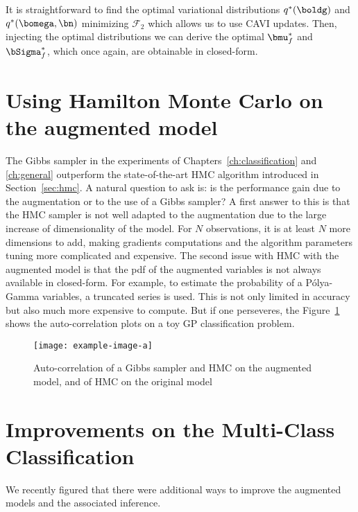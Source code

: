 It is straightforward to find the optimal variational distributions $q^*(\boldg)$ and $q^*(\bomega,\bn)$ minimizing $\mathcal{F}_2$ which allows us to use \ac{CAVI} updates.
Then, injecting the optimal distributions we can derive the optimal $\bmu_f^*$ and $\bSigma_f^*$, which once again, are obtainable in closed-form.


\section{Using Hamilton Monte Carlo on the augmented model}

The Gibbs sampler in the experiments of Chapters~\ref{ch:classification} and \ref{ch:general} outperform the state-of-the-art \ac{HMC} algorithm introduced in Section~\ref{sec:hmc}.
A natural question to ask is: is the performance gain due to the augmentation or to the use of a Gibbs sampler?
A first answer to this is that the \ac{HMC} sampler is not well adapted to the augmentation due to the large increase of dimensionality of the model.
For $N$ observations, it is at least $N$ more dimensions to add, making gradients computations and the algorithm parameters tuning more complicated and expensive.
The second issue with \ac{HMC} with the augmented model is that the \ac{pdf} of the augmented variables is not always available in closed-form.
For example, to estimate the probability of a P\'olya-Gamma variables, a truncated series is used.
This is not only limited in accuracy but also much more expensive to compute.
But if one perseveres, the Figure~\ref{fig:hmc_vs_gibbs} shows the auto-correlation plots on a toy \ac{GP} classification problem.

\begin{figure}
    \texttt{[image: example-image-a]}
    \caption{Auto-correlation of a Gibbs sampler and \ac{HMC} on the augmented model, and of \ac{HMC} on the original model}
    \label{fig:hmc_vs_gibbs}
\end{figure}


\section{Improvements on the Multi-Class Classification}
\label{sec:improvemulticlass}
We recently figured that there were additional ways to improve the augmented models and the associated inference.

